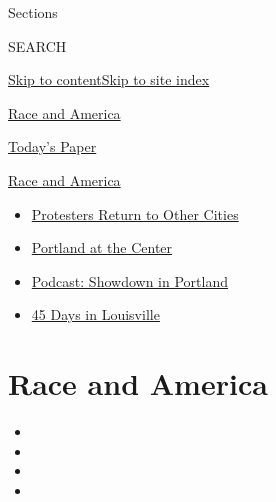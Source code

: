 Sections

SEARCH

\protect\hyperlink{site-content}{Skip to
content}\protect\hyperlink{site-index}{Skip to site index}

\href{https://www.nytimes.com/news-event/george-floyd-protests-minneapolis-new-york-los-angeles}{Race
and America}

\href{https://myaccount.nytimes.com/auth/login?response_type=cookie\&client_id=vi}{}

\href{https://www.nytimes.com/section/todayspaper}{Today's Paper}

\href{https://www.nytimes.com/news-event/george-floyd-protests-minneapolis-new-york-los-angeles?action=click\&pgtype=Article\&state=default\&region=TOP_BANNER\&context=storylines_menu}{Race
and America}

\begin{itemize}
\tightlist
\item
  \href{https://www.nytimes.com/2020/07/26/us/protests-portland-seattle-trump.html?action=click\&pgtype=Article\&state=default\&region=TOP_BANNER\&context=storylines_menu}{Protesters
  Return to Other Cities}
\item
  \href{https://www.nytimes.com/2020/07/24/us/portland-oregon-protests-white-race.html?action=click\&pgtype=Article\&state=default\&region=TOP_BANNER\&context=storylines_menu}{Portland
  at the Center}
\item
  \href{https://www.nytimes.com/2020/07/23/podcasts/the-daily/portland-protests.html?action=click\&pgtype=Article\&state=default\&region=TOP_BANNER\&context=storylines_menu}{Podcast:
  Showdown in Portland}
\item
  \href{https://www.nytimes.com/interactive/2020/07/16/us/black-lives-matter-protests-louisville-breonna-taylor.html?action=click\&pgtype=Article\&state=default\&region=TOP_BANNER\&context=storylines_menu}{45
  Days in Louisville}
\end{itemize}

\hypertarget{race-and-america}{%
\section{Race and America}\label{race-and-america}}

\begin{itemize}
\item
\item
\item
\item
\end{itemize}

